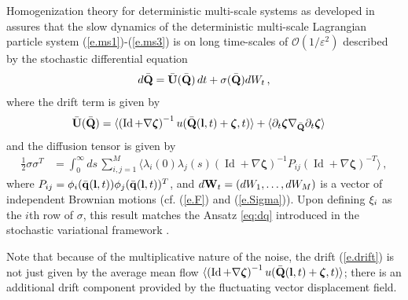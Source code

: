 \documentclass[12pt,onesided]{article}
\def\eps{\varepsilon}
\def\O{{\mathcal{O}}}
\def\q{{\bf{q}}}
\def\l{{\bf{l}}}
\def\MM#1{{\bf{#1}}}
\def\bphi{{\MM{\phi}}}
\def\Qbar{{\bar{\bf{Q}}}}
\def\Ubar{{\bar{\bf{U}}}}
\def\bzeta{{\bm{\zeta}}}
\newcommand{\difft}{d}
\newcommand*{\Id}{\operatorname{Id}}
\begin{document}
Homogenization theory for deterministic multi-scale systems as developed in \cite{MelbourneStuart11,GottwaldMelbourne13c,KellyMelbourne17} assures that the slow dynamics of the deterministic multi-scale Lagrangian particle system (\ref{e.ms1})-(\ref{e.ms3}) is on long time-scales of $\O(1/\eps^2)$ described by the stochastic differential equation
\begin{align}
\difft\Qbar = \Ubar(\Qbar) {\,\difft t} + \MM{\sigma}(\Qbar) \difft W_t\, ,
\label{e.Qbar}
\end{align}
where the drift term is given by
\begin{align}
\label{e.drift}
\Ubar(\Qbar)&= \langle \left(\Id+\nabla \bzeta\right)^{-1}u(\Qbar(\l,t)+\bzeta,t)\rangle
+\langle \partial_t\bzeta \nabla_{\Qbar}\partial_t \bzeta\rangle 
\end{align}
and the diffusion tensor is given by
\begin{align}
\frac{1}{2}\sigma\sigma^T &= \int_0^\infty \difft s\,
\sum_{i,j=1}^M
\langle
\lambda_i(0)\lambda_j(s)
\left(\Id+\nabla \bzeta\right)^{-1}P_{ij}
\left(\Id+\nabla \bzeta\right)^{-T}
\rangle \,,
\label{e.diffusion}
\end{align}
where $P_{ij}=\bphi_i(\bar\q(\l,t))\bphi_j(\bar\q(\l,t))^T$, and $\difft\MM{W}_t=(\difft W_1,\ldots,\difft W_M)$ is a vector of independent Brownian motions (cf. (\ref{e.F}) and (\ref{e.Sigma})). Upon defining $\MM{\xi}_i$ as the $i$th row of $\sigma$, this result matches the Ansatz \eqref{eq:dq} introduced in the stochastic variational framework \cite{Holm15,CrFlHo2017}. 

Note that because of the multiplicative nature of the noise, the drift (\ref{e.drift}) is not just given by the average mean flow $ \langle \left(\Id+\nabla \bzeta\right)^{-1}u(\Qbar(\l,t)+\bzeta,t)\rangle$; there is an additional drift component provided by the fluctuating vector displacement field.

\end{document}
